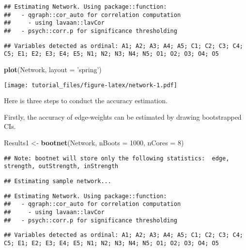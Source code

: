 \documentclass[]{article}
\newenvironment{Shaded}{\begin{snugshade}}{\end{snugshade}}
\newcommand{\KeywordTok}[1]{\textcolor[rgb]{0.13,0.29,0.53}{\textbf{#1}}}
\newcommand{\DataTypeTok}[1]{\textcolor[rgb]{0.13,0.29,0.53}{#1}}
\newcommand{\DecValTok}[1]{\textcolor[rgb]{0.00,0.00,0.81}{#1}}
\newcommand{\StringTok}[1]{\textcolor[rgb]{0.31,0.60,0.02}{#1}}
\newcommand{\NormalTok}[1]{#1}
\begin{document}
\begin{verbatim}
## Estimating Network. Using package::function:
##   - qgraph::cor_auto for correlation computation
##     - using lavaan::lavCor
##   - psych::corr.p for significance thresholding
\end{verbatim}

\begin{verbatim}
## Variables detected as ordinal: A1; A2; A3; A4; A5; C1; C2; C3; C4; C5; E1; E2; E3; E4; E5; N1; N2; N3; N4; N5; O1; O2; O3; O4; O5
\end{verbatim}

\begin{Shaded}
\begin{Highlighting}[]
\KeywordTok{plot}\NormalTok{(Network, }\DataTypeTok{layout =} \StringTok{'spring'}\NormalTok{)}
\end{Highlighting}
\end{Shaded}

\texttt{[image: tutorial\_files/figure-latex/network-1.pdf]}

Here is three steps to conduct the accuracy estimation.

Firstly, the accuracy of edge-weights can be estimated by drawing
bootstrapped CIs.

\begin{Shaded}
\begin{Highlighting}[]
\NormalTok{Results1 <-}\StringTok{ }\KeywordTok{bootnet}\NormalTok{(Network, }\DataTypeTok{nBoots =} \DecValTok{1000}\NormalTok{, }\DataTypeTok{nCores =} \DecValTok{8}\NormalTok{)}
\end{Highlighting}
\end{Shaded}

\begin{verbatim}
## Note: bootnet will store only the following statistics:  edge, strength, outStrength, inStrength
\end{verbatim}

\begin{verbatim}
## Estimating sample network...
\end{verbatim}

\begin{verbatim}
## Estimating Network. Using package::function:
##   - qgraph::cor_auto for correlation computation
##     - using lavaan::lavCor
##   - psych::corr.p for significance thresholding
\end{verbatim}

\begin{verbatim}
## Variables detected as ordinal: A1; A2; A3; A4; A5; C1; C2; C3; C4; C5; E1; E2; E3; E4; E5; N1; N2; N3; N4; N5; O1; O2; O3; O4; O5
\end{verbatim}
\end{document}
